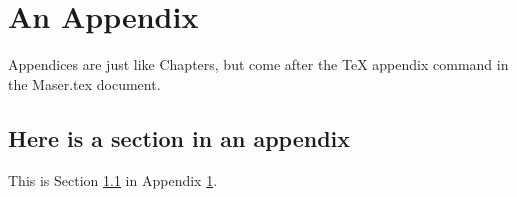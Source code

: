                       

\chapter{An Appendix}

\label{ap:appendices}

Appendices are just like Chapters, but come after the TeX \TEXTsymbol{%
\backslash}appendix command in the Maser.tex document.

\section{Here is a section in an appendix}

\label{sec:apFirstSect}

This is Section \ref{sec:apFirstSect} in Appendix \ref{ap:appendices}.
